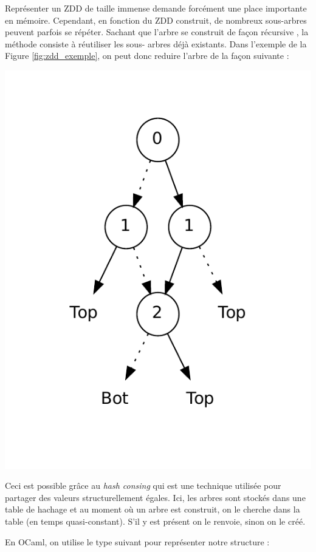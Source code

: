 \documentclass[a4paper]{article}
\begin{document}
Représenter un ZDD de taille immense demande forcément une place importante en 
mémoire. Cependant, en fonction du ZDD construit, de nombreux sous-arbres
peuvent parfois se répéter. Sachant que l'arbre se construit de façon récursive
, la méthode consiste à réutiliser les sous-
arbres déjà existants. 
Dans l'exemple de la Figure \ref{fig:zdd_exemple}, on peut donc reduire l'arbre
de la façon suivante : 
\begin{center}
\includegraphics[scale=0.6]{../imports/zdd_construct.pdf}
\end{center}

Ceci est possible grâce au \emph{hash consing} qui est une
technique utilisée pour partager des valeurs structurellement égales. Ici,
les arbres sont stockés dans une table de hachage et au moment où un arbre est 
construit, on le cherche dans la table (en temps quasi-constant). S'il y est 
présent on le renvoie, sinon on le créé.

En OCaml, on utilise le type suivant pour représenter notre structure : 
\end{document}

